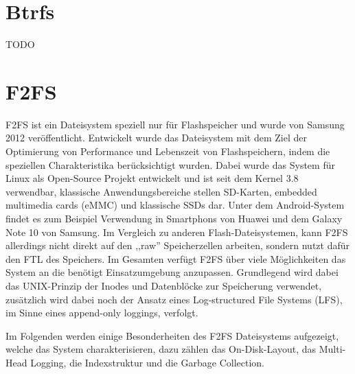 \documentclass[11pt]{article}
\begin{document}
\section{Btrfs}
\label{Btrfs}

TODO


\newpage
\section{F2FS}
\label{F2FS}
F2FS ist ein Dateisystem speziell nur für Flashspeicher und wurde von Samsung 2012 veröffentlicht. Entwickelt wurde das Dateisystem mit dem Ziel der Optimierung von Performance und Lebenszeit von Flashspeichern, indem die speziellen Charakteristika berücksichtigt wurden. Dabei wurde das System für Linux als Open-Source Projekt entwickelt und ist seit dem Kernel 3.8 verwendbar, klassische Anwendungsbereiche stellen SD-Karten, embedded multimedia cards (eMMC) und klassische SSDs dar. Unter dem Android-System findet es zum Beispiel Verwendung in Smartphons von Huawei und dem Galaxy Note 10 von Samsung. Im Vergleich zu anderen Flash-Dateisystemen, kann F2FS allerdings nicht direkt auf den ,,raw'' Speicherzellen arbeiten, sondern nutzt dafür den FTL des Speichers. Im Gesamten verfügt F2FS über viele Möglichkeiten das System an die benötigt Einsatzumgebung anzupassen. Grundlegend wird dabei das UNIX-Prinzip der Inodes und Datenblöcke zur Speicherung verwendet, zusätzlich wird dabei noch der Ansatz eines Log-structured File Systems (LFS), im Sinne eines append-only loggings, verfolgt.

Im Folgenden werden einige Besonderheiten des F2FS Dateisystems aufgezeigt, welche das System charakterisieren, dazu zählen das On-Disk-Layout, das Multi-Head Logging, die Indexstruktur und die Garbage Collection.
\end{document}
